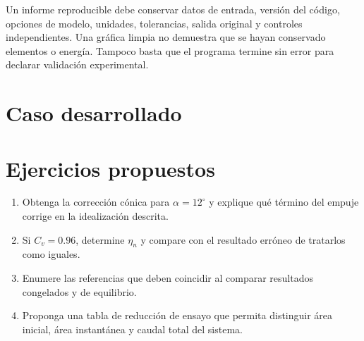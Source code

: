 Un informe reproducible debe conservar datos de entrada, versión del código, opciones de modelo, unidades, tolerancias, salida original y controles independientes. Una gráfica limpia no demuestra que se hayan conservado elementos o energía. Tampoco basta que el programa termine sin error para declarar validación experimental.
\section{Caso desarrollado}

\section{Ejercicios propuestos}
\begin{enumerate}
\item Obtenga la corrección cónica para $\alpha=12^\circ$ y explique qué término del empuje corrige en la idealización descrita.
\item Si $C_v=0.96$, determine $\eta_n$ y compare con el resultado erróneo de tratarlos como iguales.
\item Enumere las referencias que deben coincidir al comparar resultados congelados y de equilibrio.
\item Proponga una tabla de reducción de ensayo que permita distinguir área inicial, área instantánea y caudal total del sistema.
\end{enumerate}


\studiumchaptercheck
